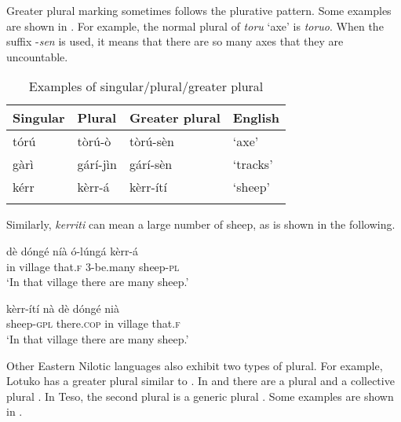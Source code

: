 \documentclass[output=paper]{langsci/langscibook}
\begin{document}
Greater plural marking sometimes follows the plurative pattern. Some examples are shown in . For example, the normal plural of \textit{toru} ‘axe’ is \textit{toruo}. When the suffix -\textit{sen }is used, it means that there are so many axes that they are uncountable.

\begin{table}
\begin{tabularx}{\textwidth}{XXXX}
\lsptoprule

 {Singular} & {Plural} & {Greater plural} & {English}\\ \midrule
 tórú &  tòrú-ò &  tòrú-sèn &  ‘axe’\\
 gàrì &  gárí-jìn &  gárí-sèn &  ‘tracks’\\
 kérr &  kèrr-á &  kèrr-ítí &  ‘sheep’\\
\lspbottomrule
\end{tabularx}
\caption{Examples of singular/plural/greater plural}
\label{tab:moodie:17}
\end{table}

Similarly, \textit{kerriti} can mean a large number of sheep, as is shown in the following.

\ea\label{ex:moodie:6}
\gll dè dóngé níà ó-lúngá kèrr-á \\
in village that.\textsc{f} 3-be.many sheep-\textsc{pl} \\
\glt ‘In that village there are many sheep.’
\z

\ea\label{ex:moodie:7}
\gll kèrr-ítí nà dè dóngé nià\\
sheep-\textsc{gpl} there.\textsc{cop} in village that.\textsc{f} \\
\glt ‘In that village there are many sheep.’
\z

Other Eastern Nilotic languages also exhibit two types of plural. For example, Lotuko has a greater plural similar to  \citep[57]{Muratori1938}. In  and  there are a plural and a collective plural \citep[242]{Dimmendaal2000}. In Teso, the second plural is a generic plural \citep[4]{HildersLawrance1957}. Some examples are shown in . 
\end{document}
